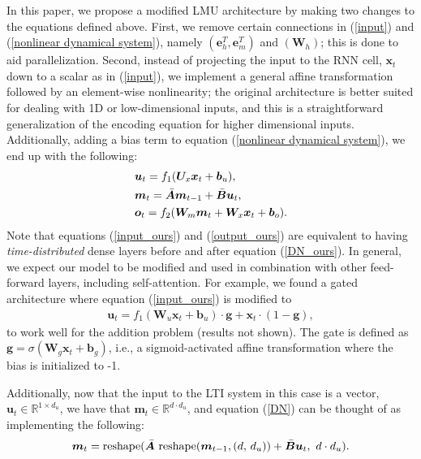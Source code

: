 \documentclass{article}
\def\vb{{\bm{b}}}
\def\ve{{\bm{e}}}
\def\vg{{\bm{g}}}
\def\vm{{\bm{m}}}
\def\vo{{\bm{o}}}
\def\vu{{\bm{u}}}
\def\vx{{\bm{x}}}
\def\mA{{\bm{A}}}
\def\mB{{\bm{B}}}
\def\mU{{\bm{U}}}
\def\mW{{\bm{W}}}
\newcommand{\R}{\mathbb{R}}
\begin{document}
In this paper, we propose a modified LMU architecture by making two changes to the equations defined above. First, we remove certain connections in (\ref{input}) and (\ref{nonlinear dynamical system}), namely $(\ve_{h}^{T}, \ve_{m}^{T})$ and $(\mW_{h})$; this is done to aid parallelization. Second, instead of projecting the input to the RNN cell, $\vx_t$ down to a scalar as in (\ref{input}), we implement a general affine transformation followed by an element-wise nonlinearity; the original architecture is better suited for dealing with 1D or low-dimensional inputs, and this is a straightforward generalization of the encoding equation for higher dimensional inputs. Additionally, adding a bias term to equation (\ref{nonlinear dynamical system}), we end up with the following:
\begin{align}
    \displaystyle
    & \vu_{t} =  f_1(\mU_x \vx_{t} + \vb_u)\label{input_ours},\\
    &\vm_{t} = \Bar{\mA} \vm_{t-1} + \Bar{\mB} \vu_{t},\label{DN_ours}\\
    &\vo_{t} = f_2(\mW_{m} \vm_{t} + \mW_{x} \vx_{t} + \vb_o)\label{output_ours}.  
\end{align}
Note that equations (\ref{input_ours}) and (\ref{output_ours}) are equivalent to having {\it time-distributed} dense layers before and after equation (\ref{DN_ours}). In general, we expect our model to be modified and used in combination with other feed-forward layers, including self-attention. For example, we found a gated architecture \citep{srivastava2015training} where equation (\ref{input_ours}) is modified to
\begin{align*}
    \vu_{t} =  f_1(\mW_u \vx_{t} + \vb_u) \cdot \vg +   \vx_t \cdot \left(1 - \vg\right),
\end{align*}
to work well for the addition problem (results not shown). The gate is defined as $\vg = \sigma(\mW_g \vx_t + \vb_g)$, i.e., a sigmoid-activated affine transformation where the bias is initialized to -1.

Additionally, now that the input to the LTI system in this case is a vector, $\vu_t \in \R^{1\times d_u}$, we have that $\vm_t \in \R^{d \cdot d_u}$, and equation (\ref{DN}) can be thought of as implementing the following: 
\begin{align}
\vm_t = \text{reshape}(\Bar{\mA}  \text{ reshape}(\vm_{t-1},  (d, \,d_u)) + \Bar{\mB} \vu_t, \,\,d\cdot d_u).
\end{align}
\end{document}
